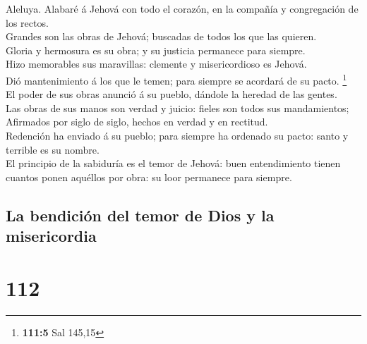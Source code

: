  Aleluya. Alabaré á Jehová con todo el corazón, en la
compañía y congregación de los rectos.\\
 Grandes son las obras de Jehová; buscadas de todos los que
las quieren.\\
 Gloria y hermosura es su obra; y su justicia permanece para
siempre.\\
 Hizo memorables sus maravillas: clemente y misericordioso
es Jehová.\\
 Dió mantenimiento á los que le temen; para siempre se
acordará de su pacto. \footnote{\textbf{111:5} Sal 145,15}\\
 El poder de sus obras anunció á su pueblo, dándole la
heredad de las gentes.\\
 Las obras de sus manos son verdad y juicio: fieles son
todos sus mandamientos;\\
 Afirmados por siglo de siglo, hechos en verdad y en
rectitud.\\
 Redención ha enviado á su pueblo; para siempre ha ordenado
su pacto: santo y terrible es su nombre.\\
 El principio de la sabiduría es el temor de Jehová: buen
entendimiento tienen cuantos ponen aquéllos por obra: su loor permanece
para siempre.

\hypertarget{la-bendiciuxf3n-del-temor-de-dios-y-la-misericordia}{%
\subsection{La bendición del temor de Dios y la
misericordia}\label{la-bendiciuxf3n-del-temor-de-dios-y-la-misericordia}}

\hypertarget{section-111}{%
\section{112}\label{section-111}}

